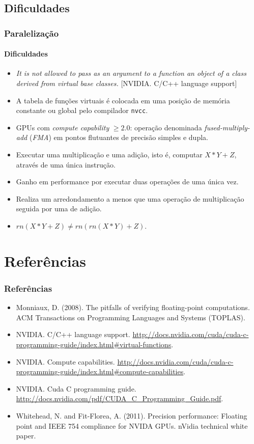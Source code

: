 \documentclass[10pt]{beamer}
\begin{document}
\subsection{Dificuldades}
\begin{frame}
\frametitle{Paralelização}
\framesubtitle{Dificuldades}


\begin{itemize}
  \item \textit{It is not allowed to pass as an argument to a 
  function an object of a class derived from virtual base classes.} [NVIDIA.
  C/C++ language support]
  
  \item  A tabela de funções virtuais é colocada em uma posição de memória
  constante ou global pelo compilador \texttt{nvcc}.

  \vspace{12pt} 

  \item GPUs com \textit{compute capability} \(\ge2.0\): operação denominada
  \textit{fused-multiply-add} (\textit{FMA}) em pontos flutuantes de precisão
  simples e dupla.
  \item  Executar uma multiplicação e uma adição, isto é, computar \(X * Y +
  Z\), através de uma única instrução.
  \item Ganho em performance por executar duas operações de uma única vez.
  \item Realiza um arredondamento a menos que uma operação de multiplicação
  seguida por uma de adição.
  \item \(rn(X*Y+Z) \ne  rn(rn(X*Y) + Z)\). 
\end{itemize}

\end{frame}

\section{Referências}
\begin{frame}
\frametitle{Referências}

\begin{itemize}
\item Monniaux, D. (2008). The pitfalls of verifying floating-point computations. ACM Transactions on Programming Languages and Systems (TOPLAS).
\item NVIDIA. C/C++ language support. \url{http://docs.nvidia.com/cuda/cuda-c-programming-guide/index.html#virtual-functions}.
\item NVIDIA. Compute capabilities. \url{http://docs.nvidia.com/cuda/cuda-c-programming-guide/index.html#compute-capabilities}.
\item NVIDIA. Cuda C programming guide. \url{http://docs.nvidia.com/pdf/CUDA_C_Programming_Guide.pdf}.
\item Whitehead, N. and Fit-Florea, A. (2011). Precision performance: Floating point and IEEE 754 compliance for NVIDA GPUs. nVidia technical white paper.
\end{itemize}

\end{frame}
\end{document}
